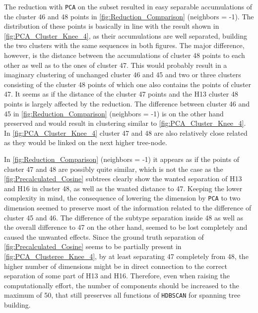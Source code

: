 \vspace{1em}

The reduction with \texttt{PCA} on the subset resulted in easy separable accumulations of the cluster 46 and 48 points in \autoref{fig:Reduction_Comparison} (neighbors = -1). The distribution of these points is basically in line with the result shown in \autoref{fig:PCA_Cluster_Knee_4}, as their accumulations are well separated, building the two clusters with the same sequences in both figures. The major difference, however, is the distance between the accumulations of cluster 48 points to each other as well as to the ones of cluster 47. This would probably result in a imaginary clustering of unchanged cluster 46 and 45 and two or three clusters consisting of the cluster 48 points of which one also contains the points of cluster 47. It seems as if the distance of the cluster 47 points and the H13 cluster 48 points is largely affected by the reduction. The difference between cluster 46 and 45 in \autoref{fig:Reduction_Comparison} (neighbors = -1) is on the other hand preserved and would result in clustering similar to \autoref{fig:PCA_Cluster_Knee_4}. In \autoref{fig:PCA_Cluster_Knee_4} cluster 47 and 48 are also relatively close related as they would be linked on the next higher tree-node.

\vspace{1em}

In \autoref{fig:Reduction_Comparison} (neighbors = -1) it appears as if the points of cluster 47 and 48 are possibly quite similar, which is not the case as the \autoref{fig:Precalculated_Cosine} subtrees clearly show the wanted separation of H13 and H16 in cluster 48, as well as the wanted distance to 47. Keeping the lower complexity in mind, the consequence of lowering the dimension by \texttt{PCA} to two dimension seemed to preserve most of the information related to the difference of cluster 45 and 46. The difference of the subtype separation inside 48 as well as the overall difference to 47 on the other hand, seemed to be lost completely and caused the unwanted effects. Since the ground truth separation of \autoref{fig:Precalculated_Cosine} seems to be partially present in \autoref{fig:PCA_Clusteree_Knee_4}, by at least separating 47 completely from 48, the higher number of dimensions might be in direct connection to the correct separation of some part of H13 and H16. Therefore, even when raising the computationally effort, the number of components should be increased to the maximum of 50, that still preserves all functions of \texttt{HDBSCAN} for spanning tree building. 

